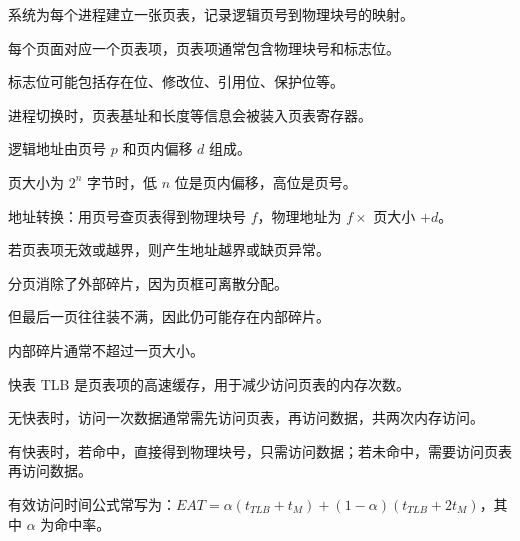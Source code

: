 \begin{points}
  \item 系统为每个进程建立一张页表，记录逻辑页号到物理块号的映射。
  \item 每个页面对应一个页表项，页表项通常包含物理块号和标志位。
  \item 标志位可能包括存在位、修改位、引用位、保护位等。
  \item 进程切换时，页表基址和长度等信息会被装入页表寄存器。
\end{points}


\begin{points}
  \item 逻辑地址由页号 $p$ 和页内偏移 $d$ 组成。
  \item 页大小为 $2^n$ 字节时，低 $n$ 位是页内偏移，高位是页号。
  \item 地址转换：用页号查页表得到物理块号 $f$，物理地址为 $f\times$ 页大小 $+d$。
  \item 若页表项无效或越界，则产生地址越界或缺页异常。
\end{points}

\begin{points}
  \item 分页消除了外部碎片，因为页框可离散分配。
  \item 但最后一页往往装不满，因此仍可能存在内部碎片。
  \item 内部碎片通常不超过一页大小。
\end{points}

\begin{points}
  \item 快表 TLB 是页表项的高速缓存，用于减少访问页表的内存次数。
  \item 无快表时，访问一次数据通常需先访问页表，再访问数据，共两次内存访问。
  \item 有快表时，若命中，直接得到物理块号，只需访问数据；若未命中，需要访问页表再访问数据。
  \item 有效访问时间公式常写为：$EAT=\alpha(t_{TLB}+t_M)+(1-\alpha)(t_{TLB}+2t_M)$，其中 $\alpha$ 为命中率。
\end{points}


